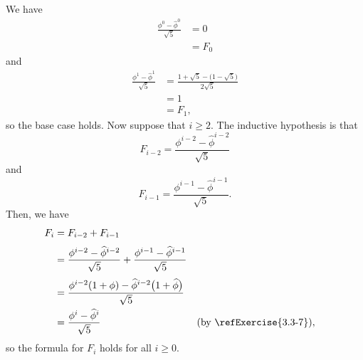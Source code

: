 
\noindent We have
\begin{align*}
    \frac{\phi^0-\widehat\phi^0}{\sqrt{5}} &= 0 \\
    &= F_0
\end{align*}
and
\begin{align*}
    \frac{\phi^1-\widehat\phi^1}{\sqrt{5}} &= \frac{1+\sqrt{5}-\bigl(1-\sqrt{5}\bigr)}{2\sqrt{5}} \\
    &= 1 \\
    &= F_1,
\end{align*}
so the base case holds.
Now suppose that $i\ge2$.
The inductive hypothesis is that
\[
    F_{i-2} = \frac{\phi^{i-2}-\widehat\phi^{i-2}}{\sqrt{5}}
\]
and
\[
    F_{i-1} = \frac{\phi^{i-1}-\widehat\phi^{i-1}}{\sqrt{5}}.
\]
Then, we have
\begin{align*}
    F_i &= F_{i-2}+F_{i-1} \\[1mm]
    &= \frac{\phi^{i-2}-\widehat\phi^{i-2}}{\sqrt{5}}+\frac{\phi^{i-1}-\widehat\phi^{i-1}}{\sqrt{5}} \\[1mm]
    &= \frac{\phi^{i-2}(1+\phi)-\widehat\phi^{i-2}\bigl(1+\widehat\phi\bigr)}{\sqrt{5}} \\
    &= \frac{\phi^i-\widehat\phi^i}{\sqrt{5}} && \text{(by \refExercise{3.3-7})},
\end{align*}
so the formula for $F_i$ holds for all $i\ge0$.
